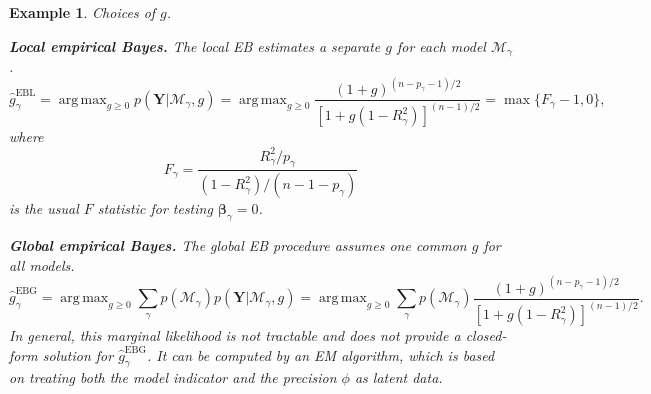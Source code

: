 \documentclass[11pt]{article}
\DeclareMathOperator*{\argmax}{arg\,max}
\newcommand{\BY}{\mathbf{Y}}    \newcommand{\BZ}{\mathbf{Z}}
\newcommand{\bfsym}[1]{\ensuremath{\boldsymbol{#1}}}
\def\bbeta{\bfsym \beta}
\theoremstyle{plain}
\newtheorem{example}{Example}
\theoremstyle{definition}
\theoremstyle{remark}
\begin{document}
\begin{example}
    Choices of $g$.

\textbf{Local empirical Bayes.} The local EB estimates a separate $g$ for each model $\mathcal M_\gamma$.
\begin{equation*}
    \hat g_\gamma^{\text{EBL}} =
    \argmax_{g\geq 0} p(\BY | \mathcal M_\gamma, g) 
    =
    \argmax_{g\geq 0} \frac{(1+g)^{(n-p_{\gamma}-1)/2}}{[1+g(1-R_\gamma^2)]^{(n-1)/2}}
    =\max\{F_\gamma-1, 0\},
\end{equation*}
where 
\begin{equation*}
F_\gamma=
\frac{R^2_\gamma/p_\gamma}{
    (1-R^2_\gamma) / (n-1-p_\gamma)
}
\end{equation*}
is the usual $F$ statistic for testing $\bbeta_\gamma=0$.

\textbf{Global empirical Bayes.} The global EB procedure assumes one common $g$ for all models.
\begin{equation*}
    \hat g_\gamma^{\text{EBG}} =
    \argmax_{g\geq 0} \sum_{\gamma} p(\mathcal M_\gamma) p(\BY | \mathcal M_\gamma, g) 
    =
    \argmax_{g\geq 0} \sum_{\gamma} p(\mathcal M_\gamma) \frac{(1+g)^{(n-p_{\gamma}-1)/2}}{[1+g(1-R_\gamma^2)]^{(n-1)/2}}.
\end{equation*}
In general, this marginal likelihood is not tractable and does not provide a closed-form solution for $\hat g_\gamma^{\text{EBG}}$.
It can be computed by an EM algorithm, which is based on treating both the model indicator and the precision $\phi$ as latent data.


    
\end{example}
\end{document}
